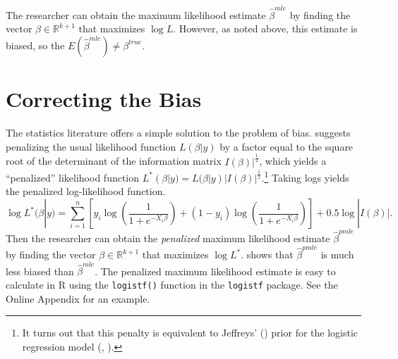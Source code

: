 \documentclass[12pt]{article}
\begin{document}
%

The researcher can obtain the maximum likelihood estimate $\hat{\beta}^{mle}$ by finding the vector $\beta \in \mathbb{R}^{k + 1}$ that maximizes $\log L$. However, as noted above, this estimate is biased, so the $E(\hat{\beta}^{mle}) \neq \beta^{true}$.

\section*{Correcting the Bias}

The statistics literature offers a simple solution to the problem of bias. \citet{Firth1993} suggests penalizing the usual likelihood function $L(\beta | y)$ by a factor equal to the square root of the determinant of the information matrix $I(\beta)|^\frac{1}{2}$, which yields a ``penalized'' likelihood function $L^*(\beta | y) = L(\beta | y)|I(\beta)|^\frac{1}{2}$.\footnote{It turns out that this penalty is equivalent to Jeffreys' (\citeyear{Jeffreys1946}) prior for the logistic regression model (\citealt{Firth1993}, \citealt{Poirier1994}).} Taking logs yields the penalized log-likelihood function.
\begin{equation}\nonumber
\log L^*(\beta | y) = \displaystyle \sum_{i = 1}^n \left[y_i \log \left( \dfrac{1}{1 + e^{-X_i\beta}}\right) + (1 - y_i) \log \left( \dfrac{1}{1 + e^{-X_i\beta}}\right)\right] + 0.5 \log |I(\beta)|.
\end{equation}
Then the researcher can obtain the \emph{penalized} maximum likelihood estimate $\hat{\beta}^{pmle}$ by finding the vector $\beta \in \mathbb{R}^{k + 1}$ that maximizes $\log L^*$. \citet{Firth1993} shows that $\hat{\beta}^{pmle}$ is much less biased than $\hat{\beta}^{mle}$. The penalized maximum likelihood estimate is easy to calculate in R using the \texttt{logistf()} function in the \texttt{logistf} package. See the Online Appendix for an example.
\end{document}
